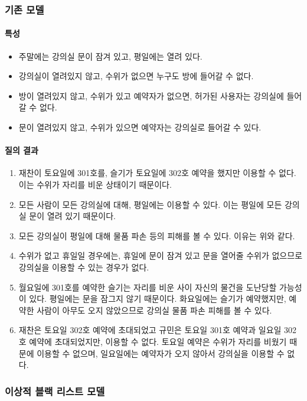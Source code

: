\documentclass[11pt,a4paper]{article}
\begin{document}
\subsubsection{기존 모델}

\paragraph{특성}
\begin{itemize}
\item 주말에는 강의실 문이 잠겨 있고, 평일에는 열려 있다.
\item 강의실이 열려있지 않고, 수위가 없으면 누구도 방에 들어갈 수 없다.
\item 방이 열려있지 않고, 수위가 있고 예약자가 없으면, 허가된 사용자는 강의실에
들어갈 수 없다.
\item 문이 열려있지 않고, 수위가 있으면 예약자는 강의실로 들어갈 수 있다.
\end{itemize}

\paragraph{질의 결과}
\begin{enumerate}
\item 재찬이 토요일에 301호를, 슬기가 토요일에 302호 예약을 했지만 이용할 수
없다. 이는 수위가 자리를 비운 상태이기 때문이다.
\item 모든 사람이 모든 강의실에 대해, 평일에는 이용할 수 있다. 이는 평일에 모든
강의실 문이 열려 있기 때문이다.
\item 모든 강의실이 평일에 대해 물품 파손 등의 피해를 볼 수 있다. 이유는 위와
같다.
\item 수위가 없고 휴일일 경우에는, 휴일에 문이 잠겨 있고 문을 열어줄 수위가
없으므로 강의실을 이용할 수 있는 경우가 없다.
\item 월요일에 301호를 예약한 슬기는 자리를 비운 사이 자신의 물건을 도난당할
가능성이 있다. 평일에는 문을 잠그지 않기 때문이다. 화요일에는 슬기가
예약했지만, 예약한 사람이 아무도 오지 않았으므로 강의실 물품 파손 피해를 볼 수
있다.
\item 재찬은 토요일 302호 예약에 초대되었고 규민은 토요일 301호 예약과 일요일
302호 예약에 초대되었지만, 이용할 수 없다. 토요일 예약은 수위가 자리를 비웠기
때문에 이용할 수 없으며, 일요일에는 예약자가 오지 않아서 강의실을 이용할 수
없다.
\end{enumerate}

\subsubsection{이상적 블랙 리스트 모델}
\end{document}
